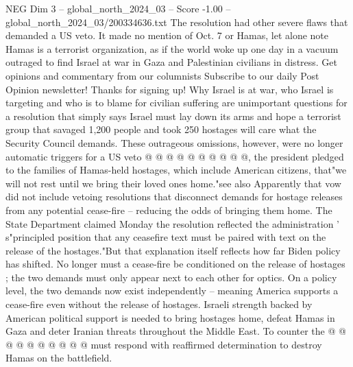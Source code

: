 \begin{textsample}{NEG Dim 3 – global\_north\_2024\_03 – Score -1.00 – global\_north\_2024\_03/200334636.txt}
The resolution had other severe flaws that demanded a US veto.
It made no mention of Oct. 7 or Hamas, let alone note Hamas is a terrorist organization, as if the world woke up one day in a vacuum outraged to find Israel at war in Gaza and Palestinian civilians in distress.
Get opinions and commentary from our columnists Subscribe to our daily Post Opinion newsletter!
Thanks for signing up!
Why Israel is at war, who Israel is targeting and who is to blame for civilian suffering are unimportant questions for a resolution that simply says Israel must lay down its arms and hope a terrorist group that savaged 1,200 people and took 250 hostages will care what the Security Council demands.
These outrageous omissions, however, were no longer automatic triggers for a US veto @ @ @ @ @ @ @ @ @ @, the president pledged to the families of Hamas-held hostages, which include American citizens, that"we will not rest until we bring their loved ones home."see also Apparently that vow did not include vetoing resolutions that disconnect demands for hostage releases from any potential cease-fire -- reducing the odds of bringing them home.
The State Department claimed Monday the resolution reflected the administration ' s"principled position that any ceasefire text must be paired with text on the release of the hostages."But that explanation itself reflects how far Biden policy has shifted.
No longer must a cease-fire be conditioned on the release of hostages ; the two demands must only appear next to each other for optics.
On a policy level, the two demands now exist independently -- meaning America supports a cease-fire even without the release of hostages.
Israeli strength backed by American political support is needed to bring hostages home, defeat Hamas in Gaza and deter Iranian threats throughout the Middle East.
To counter the @ @ @ @ @ @ @ @ @ @ must respond with reaffirmed determination to destroy Hamas on the battlefield.

\end{textsample}
